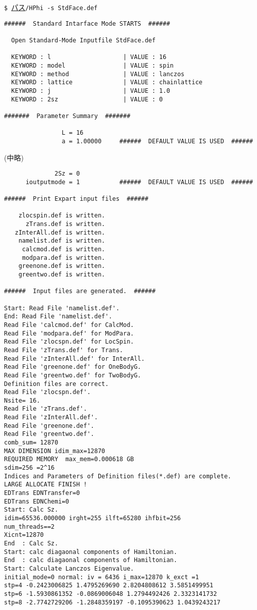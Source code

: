 \vspace{1cm}\hspace{-0.7cm}
\verb|$ |\underline{パス}\verb|/HPhi -s StdFace.def|
\begin{verbatim}
######  Standard Intarface Mode STARTS  ######

  Open Standard-Mode Inputfile StdFace.def 

  KEYWORD : l                    | VALUE : 16 
  KEYWORD : model                | VALUE : spin 
  KEYWORD : method               | VALUE : lanczos 
  KEYWORD : lattice              | VALUE : chainlattice 
  KEYWORD : j                    | VALUE : 1.0 
  KEYWORD : 2sz                  | VALUE : 0 

#######  Parameter Summary  #######

                L = 16 
                a = 1.00000     ######  DEFAULT VALUE IS USED  ######
\end{verbatim}
(中略)
\begin{verbatim}
              2Sz = 0  
      ioutputmode = 1           ######  DEFAULT VALUE IS USED  ######

######  Print Expart input files  ######

    zlocspin.def is written.
      zTrans.def is written.
   zInterAll.def is written.
    namelist.def is written.
     calcmod.def is written.
     modpara.def is written.
    greenone.def is written.
    greentwo.def is written.

######  Input files are generated.  ######

Start: Read File 'namelist.def'.
End: Read File 'namelist.def'.
Read File 'calcmod.def' for CalcMod.
Read File 'modpara.def' for ModPara.
Read File 'zlocspn.def' for LocSpin.
Read File 'zTrans.def' for Trans.
Read File 'zInterAll.def' for InterAll.
Read File 'greenone.def' for OneBodyG.
Read File 'greentwo.def' for TwoBodyG.
Definition files are correct.
Read File 'zlocspn.def'.
Nsite= 16.
Read File 'zTrans.def'.
Read File 'zInterAll.def'.
Read File 'greenone.def'.
Read File 'greentwo.def'.
comb_sum= 12870 
MAX DIMENSION idim_max=12870 
REQUIRED MEMORY  max_mem=0.000618 GB 
sdim=256 =2^16
Indices and Parameters of Definition files(*.def) are complete.
LARGE ALLOCATE FINISH !
EDTrans EDNTransfer=0 
EDTrans EDNChemi=0 
Start: Calc Sz. 
idim=65536.000000 irght=255 ilft=65280 ihfbit=256 
num_threads==2
Xicnt=12870 
End  : Calc Sz. 
Start: calc diagaonal components of Hamiltonian. 
End  : calc diagaonal components of Hamiltonian. 
Start: Calculate Lanczos Eigenvalue.
initial_mode=0 normal: iv = 6436 i_max=12870 k_exct =1 
stp=4 -0.2423006825 1.4795269690 2.8204808612 3.5851499951 
stp=6 -1.5930861352 -0.0869006048 1.2794492426 2.3323141732 
stp=8 -2.7742729206 -1.2848359197 -0.1095390623 1.0439243217 
\end{verbatim}
